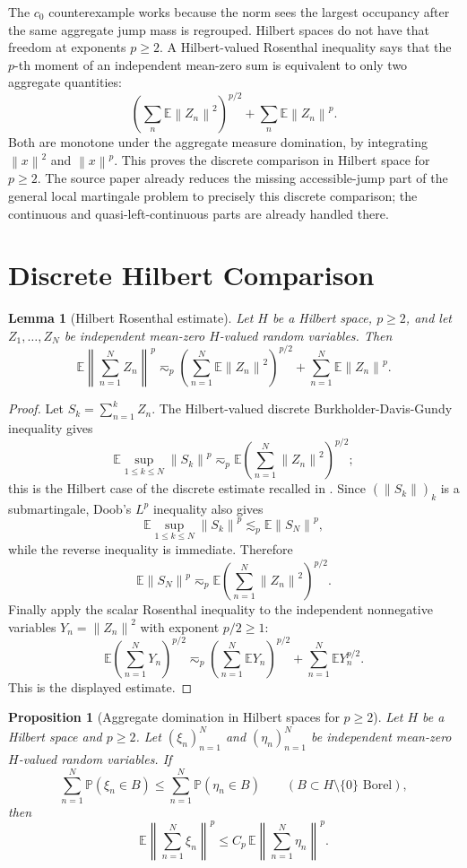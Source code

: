 \documentclass[11pt]{article}
\newtheorem{proposition}{Proposition}
\newtheorem{lemma}{Lemma}
\newcommand{\E}{\mathbb E}
\newcommand{\Pp}{\mathbb P}
\newcommand{\norm}[1]{\left\lVert #1\right\rVert}
\begin{document}
The \(c_0\) counterexample works because the norm sees the largest occupancy
after the same aggregate jump mass is regrouped.  Hilbert spaces do not have
that freedom at exponents \(p\geq2\).  A Hilbert-valued Rosenthal inequality
says that the \(p\)-th moment of an independent mean-zero sum is equivalent to
only two aggregate quantities:
\[
  \left(\sum_n \E\norm{Z_n}^2\right)^{p/2}
  +
  \sum_n \E\norm{Z_n}^p .
\]
Both are monotone under the aggregate measure domination, by integrating
\(\norm{x}^2\) and \(\norm{x}^p\).  This proves the discrete comparison in
Hilbert space for \(p\geq2\).  The source paper already reduces the missing
accessible-jump part of the general local martingale problem to precisely this
discrete comparison; the continuous and quasi-left-continuous parts are already
handled there.

\section*{Discrete Hilbert Comparison}

\begin{lemma}[Hilbert Rosenthal estimate]\label{lem:hilbert-rosenthal}
Let \(H\) be a Hilbert space, \(p\geq2\), and let
\(Z_1,\ldots,Z_N\) be independent mean-zero \(H\)-valued random variables.
Then
\[
 \E\norm{\sum_{n=1}^N Z_n}^p
 \eqsim_p
 \left(\sum_{n=1}^N \E\norm{Z_n}^2\right)^{p/2}
 +
 \sum_{n=1}^N \E\norm{Z_n}^p .
\]
\end{lemma}

\begin{proof}
Let \(S_k=\sum_{n=1}^k Z_n\).  The Hilbert-valued discrete
Burkholder-Davis-Gundy inequality gives
\[
  \E\sup_{1\leq k\leq N}\norm{S_k}^p
  \eqsim_p
  \E\left(\sum_{n=1}^N\norm{Z_n}^2\right)^{p/2};
\]
this is the Hilbert case of the discrete estimate recalled in
\cite{Yaroslavtsev2018}.  Since \((\norm{S_k})_k\) is a submartingale, Doob's
\(L^p\) inequality also gives
\[
  \E\sup_{1\leq k\leq N}\norm{S_k}^p
  \lesssim_p
  \E\norm{S_N}^p,
\]
while the reverse inequality is immediate.  Therefore
\[
  \E\norm{S_N}^p
  \eqsim_p
  \E\left(\sum_{n=1}^N\norm{Z_n}^2\right)^{p/2}.
\]
Finally apply the scalar Rosenthal inequality to the independent nonnegative
variables \(Y_n=\norm{Z_n}^2\) with exponent \(p/2\geq1\):
\[
 \E\left(\sum_{n=1}^N Y_n\right)^{p/2}
 \eqsim_p
 \left(\sum_{n=1}^N \E Y_n\right)^{p/2}
 +
 \sum_{n=1}^N \E Y_n^{p/2}.
\]
This is the displayed estimate.
\end{proof}

\begin{proposition}[Aggregate domination in Hilbert spaces for \(p\geq2\)]
\label{prop:discrete-hilbert}
Let \(H\) be a Hilbert space and \(p\geq2\).  Let
\((\xi_n)_{n=1}^N\) and \((\eta_n)_{n=1}^N\) be independent mean-zero
\(H\)-valued random variables.  If
\[
   \sum_{n=1}^N \Pp(\xi_n\in B)
   \leq
   \sum_{n=1}^N \Pp(\eta_n\in B)
   \qquad
   (B\subset H\setminus\{0\}\text{ Borel}),
\]
then
\[
   \E\norm{\sum_{n=1}^N \xi_n}^p
   \leq
   C_p\,\E\norm{\sum_{n=1}^N \eta_n}^p .
\]
\end{proposition}
\end{document}
